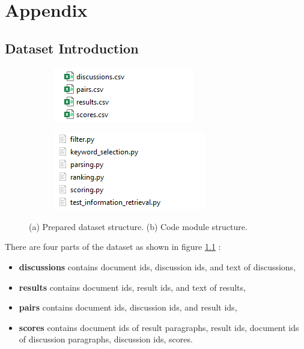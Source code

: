 
\chapter{Appendix}
\section{Dataset Introduction} 	

\begin{figure}[htbp]
	\centering
	\begin{subfigure}[b]{0.48\textwidth}
		\centering
		\includegraphics[width=\textwidth]{figure/dataset_structure}
		\caption{}
		\label{fig: datasetstructure}
	\end{subfigure}
	\hfill
	\begin{subfigure}[b]{0.48\textwidth}
		\centering
		\includegraphics[width=\textwidth]{figure/code_structure}
		\caption{}
		\label{fig: codestructure}
	\end{subfigure}
	\hfill
	\caption[]{(a) Prepared dataset structure. (b) Code module structure.}
	\label{fig: structures}
\end{figure}

There are four parts of the dataset as shown in figure \ref{fig: datasetstructure} : 
\begin{itemize}
	\item \textbf{discussions} contains document ids, discussion ids, and text of discussions,
	\item \textbf{results} contains document ids, result ids, and text of results, 
	\item \textbf{pairs}  contains document ids, discussion ids, and result ids, 
	\item \textbf{scores}  contains document ids of result paragraphs, result ids, document ids of discussion paragraphs, discussion ids, scores.			
\end{itemize}				


